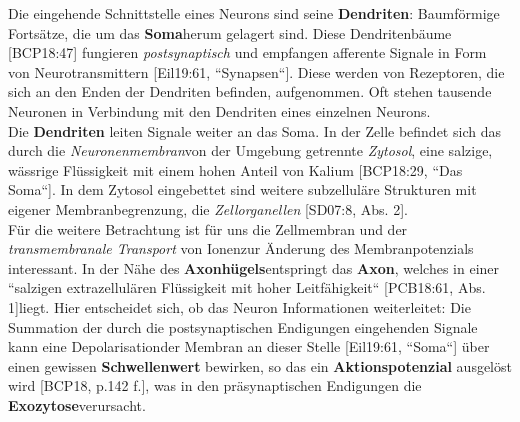 Die eingehende Schnittstelle eines Neurons sind seine \textbf{Dendriten}: Baumförmige Fortsätze\footnotemark[9], die um das \textbf{Soma}\footnotemark[10] herum gelagert sind.
Diese Dendritenbäume [BCP18:47] fungieren \textit{postsynaptisch} und empfangen afferente Signale in Form von Neurotransmittern [Eil19:61, ``Synapsen``].
Diese werden von Rezeptoren, die sich an den Enden der Dendriten befinden, aufgenommen.
Oft stehen tausende Neuronen in Verbindung mit den Dendriten eines einzelnen Neurons\footnotemark[10] [SD07, S .42].\\


Die \textbf{Dendriten} leiten Signale weiter an das Soma.
In der Zelle befindet sich das durch die \textit{Neuronenmembran}\footnotemark[11] von der Umgebung getrennte \textit{Zytosol}, eine salzige, wässrige Flüssigkeit mit einem hohen Anteil von Kalium [BCP18:29, ``Das Soma``]\footnotemark[12].
In dem Zytosol eingebettet sind weitere subzelluläre Strukturen mit eigener Membranbegrenzung, die \textit{Zellorganellen} [SD07:8, Abs. 2].\\
Für die weitere Betrachtung ist für uns die Zellmembran und der \textit{transmembranale Transport} von Ionen\footnotemark[13] zur Änderung des Membranpotenzials interessant. In der Nähe des \textbf{Axonhügels}\footnotemark[14] entspringt das \textbf{Axon}, welches in einer ``salzigen extrazellulären Flüssigkeit mit hoher Leitfähigkeit`` [PCB18:61, Abs. 1]\footnotemark[15] liegt.
Hier entscheidet sich, ob das Neuron Informationen weiterleitet: Die Summation der durch die postsynaptischen Endigungen eingehenden Signale kann eine Depolarisation\footnotemark[16] der Membran an dieser Stelle [Eil19:61, ``Soma``] über einen gewissen \textbf{Schwellenwert} bewirken, so das ein \textbf{Aktionspotenzial} ausgelöst wird [BCP18, p.142 f.], was in den präsynaptischen Endigungen die \textbf{Exozytose}\footnotemark[17] verursacht.

